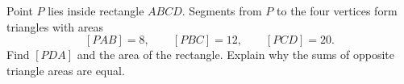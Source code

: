 Point $P$ lies inside rectangle $ABCD$. Segments from $P$ to the four vertices form triangles with areas
\[
[PAB]=8,\qquad [PBC]=12,\qquad [PCD]=20.
\]
Find $[PDA]$ and the area of the rectangle. Explain why the sums of opposite triangle areas are equal.
